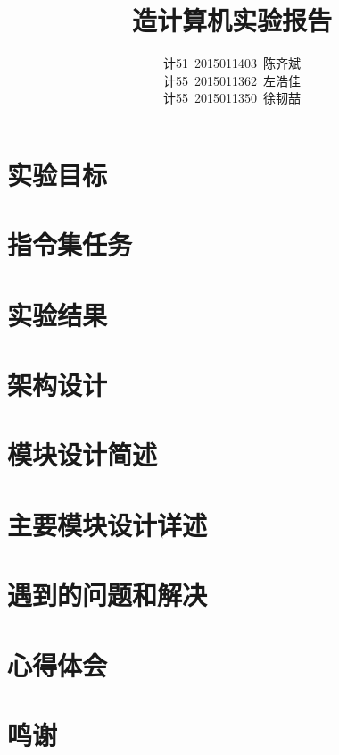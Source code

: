 \documentclass[a4paper]{article}
\title{造计算机实验报告}
\author
{
    计51~2015011403~陈齐斌\\
    计55~2015011362~左浩佳\\
    计55~2015011350~徐韧喆
}
\date{}
\begin{document}
    \maketitle

    \tableofcontents
    
    \section{实验目标}

    \section{指令集任务}

    \section{实验结果}

    \section{架构设计}

    \section{模块设计简述}

    \section{主要模块设计详述}

    \section{遇到的问题和解决}

    \section{心得体会}

    \section*{鸣谢}
\end{document}
